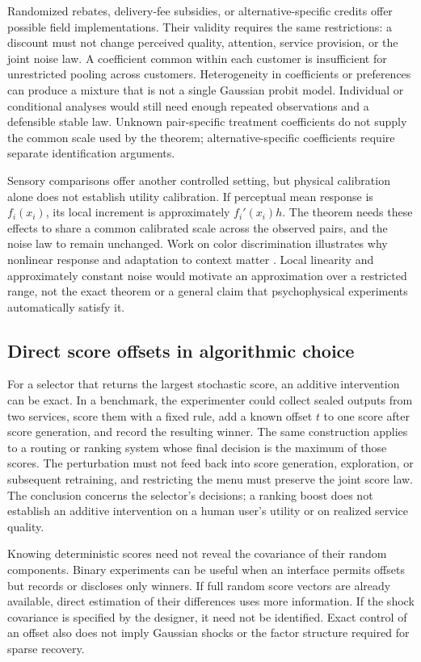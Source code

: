 \documentclass[11pt]{amsart}
\theoremstyle{definition}
\begin{document}
Randomized rebates, delivery-fee subsidies, or alternative-specific credits offer possible field implementations. Their validity requires the same restrictions: a discount must not change perceived quality, attention, service provision, or the joint noise law. A coefficient common within each customer is insufficient for unrestricted pooling across customers. Heterogeneity in coefficients or preferences can produce a mixture that is not a single Gaussian probit model. Individual or conditional analyses would still need enough repeated observations and a defensible stable law. Unknown pair-specific treatment coefficients do not supply the common scale used by the theorem; alternative-specific coefficients require separate identification arguments.

Sensory comparisons offer another controlled setting, but physical calibration alone does not establish utility calibration. If perceptual mean response is $f_i(x_i)$, its local increment is approximately $f_i'(x_i)h$. The theorem needs these effects to share a common calibrated scale across the observed pairs, and the noise law to remain unchanged. Work on color discrimination illustrates why nonlinear response and adaptation to context matter \cite{hillis2005}. Local linearity and approximately constant noise would motivate an approximation over a restricted range, not the exact theorem or a general claim that psychophysical experiments automatically satisfy it.

\subsection{Direct score offsets in algorithmic choice}
For a selector that returns the largest stochastic score, an additive intervention can be exact. In a benchmark, the experimenter could collect sealed outputs from two services, score them with a fixed rule, add a known offset $t$ to one score after score generation, and record the resulting winner. The same construction applies to a routing or ranking system whose final decision is the maximum of those scores. The perturbation must not feed back into score generation, exploration, or subsequent retraining, and restricting the menu must preserve the joint score law. The conclusion concerns the selector's decisions; a ranking boost does not establish an additive intervention on a human user's utility or on realized service quality.

Knowing deterministic scores need not reveal the covariance of their random components. Binary experiments can be useful when an interface permits offsets but records or discloses only winners. If full random score vectors are already available, direct estimation of their differences uses more information. If the shock covariance is specified by the designer, it need not be identified. Exact control of an offset also does not imply Gaussian shocks or the factor structure required for sparse recovery.
\end{document}
